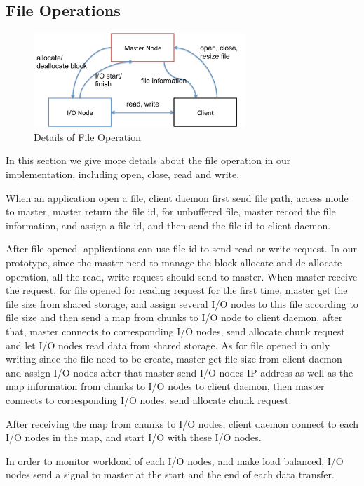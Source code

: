 \subsection{File Operations}

\begin{figure}
\centering
\includegraphics[width=8cm]{img/file_operation}
\caption{Details of File Operation}
\label{implementation:file operation}
\end{figure}

In this section we give more details about the file operation in our implementation, including
open, close, read and write.

When an application open a file, client daemon first send file path, access mode to master,
master return the file id,
for unbuffered file, master record the file information, and assign a file id, and then send the
file id to client daemon.

After file opened, applications can use file id to send read or write request.
In our prototype, since the master need to manage the block allocate and de-allocate operation, all
the read, write request should send to master.
When master receive the request, for file opened for reading
request for the first time, master get the file size from shared storage, and assign several I/O
nodes to this file according to file size and then send a map from chunks to I/O node to client
daemon, after that, master connects to corresponding I/O nodes, send allocate chunk request and
let I/O nodes read data from shared storage.
As for file opened in only writing since the file need to be create, master get file size from
client daemon and assign I/O nodes after that master send I/O nodes IP address as well as the map
information from chunks to I/O nodes to client daemon, then master connects to corresponding I/O
nodes, send allocate chunk request.

After receiving the map from chunks to I/O nodes, client daemon connect to each I/O
nodes in the map, and start I/O with these I/O nodes.

In order to monitor workload of each I/O nodes, and make load balanced, I/O nodes send a signal to
master at the start and the end of each data transfer.

